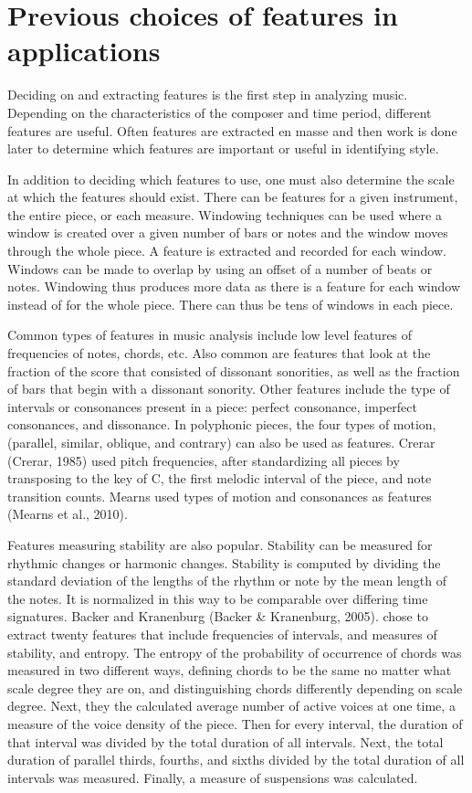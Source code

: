 \documentclass[12pt,twoside]{reedthesis}
\theoremstyle{definition}
\theoremstyle{definition}
\theoremstyle{definition}
\theoremstyle{remark}
\begin{document}
\section{Previous choices of features in
applications}\label{previous-choices-of-features-in-applications}

Deciding on and extracting features is the first step in analyzing
music. Depending on the characteristics of the composer and time period,
different features are useful. Often features are extracted en masse and
then work is done later to determine which features are important or
useful in identifying style.

In addition to deciding which features to use, one must also determine
the scale at which the features should exist. There can be features for
a given instrument, the entire piece, or each measure. Windowing
techniques can be used where a window is created over a given number of
bars or notes and the window moves through the whole piece. A feature is
extracted and recorded for each window. Windows can be made to overlap
by using an offset of a number of beats or notes. Windowing thus
produces more data as there is a feature for each window instead of for
the whole piece. There can thus be tens of windows in each piece.

Common types of features in music analysis include low level features of
frequencies of notes, chords, etc. Also common are features that look at
the fraction of the score that consisted of dissonant sonorities, as
well as the fraction of bars that begin with a dissonant sonority. Other
features include the type of intervals or consonances present in a
piece: perfect consonance, imperfect consonances, and dissonance. In
polyphonic pieces, the four types of motion, (parallel, similar,
oblique, and contrary) can also be used as features. Crerar (Crerar,
1985) used pitch frequencies, after standardizing all pieces by
transposing to the key of C, the first melodic interval of the piece,
and note transition counts. Mearns used types of motion and consonances
as features (Mearns et al., 2010).

Features measuring stability are also popular. Stability can be measured
for rhythmic changes or harmonic changes. Stability is computed by
dividing the standard deviation of the lengths of the rhythm or note by
the mean length of the notes. It is normalized in this way to be
comparable over differing time signatures. Backer and Kranenburg (Backer
\& Kranenburg, 2005). chose to extract twenty features that include
frequencies of intervals, and measures of stability, and entropy. The
entropy of the probability of occurrence of chords was measured in two
different ways, defining chords to be the same no matter what scale
degree they are on, and distinguishing chords differently depending on
scale degree. Next, they the calculated average number of active voices
at one time, a measure of the voice density of the piece. Then for every
interval, the duration of that interval was divided by the total
duration of all intervals. Next, the total duration of parallel thirds,
fourths, and sixths divided by the total duration of all intervals was
measured. Finally, a measure of suspensions was calculated.
\end{document}

